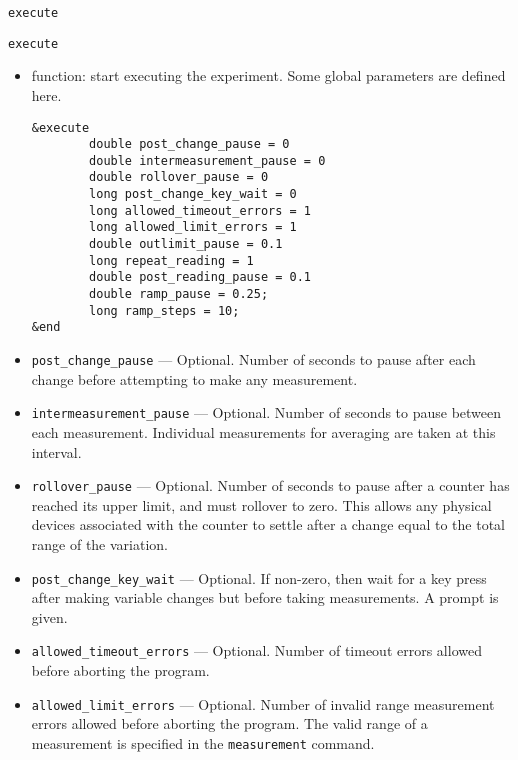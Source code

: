 \begin{itemize}
\begin{itemize}
\begin{latexonly}
\newpage\begin{center}{\Large \verb+execute+}\end{center}
\end{latexonly}
\begin{htmlonly}
\item {\Large \verb+execute+}
\end{htmlonly}
\begin{itemize}
   \item function: start executing the experiment. Some global parameters are defined here.
\begin{verbatim}
&execute
        double post_change_pause = 0
        double intermeasurement_pause = 0
        double rollover_pause = 0
        long post_change_key_wait = 0
        long allowed_timeout_errors = 1
        long allowed_limit_errors = 1
        double outlimit_pause = 0.1
        long repeat_reading = 1
        double post_reading_pause = 0.1
        double ramp_pause = 0.25;
        long ramp_steps = 10;
&end
\end{verbatim}
   \item {\verb+post_change_pause+} ---  Optional. Number of seconds to pause after each change before
      attempting to make any measurement.

   \item {\verb+intermeasurement_pause+} --- Optional. Number of
      seconds to pause between each measurement.  Individual
      measurements for averaging are taken at this interval.

   \item {\verb+rollover_pause+} --- Optional. Number of seconds to
      pause after a counter has reached its upper limit, and must
      rollover to zero. This allows any physical devices associated
      with the counter to settle after a change equal to the total
      range of the variation.

   \item {\verb+post_change_key_wait+} --- Optional. If non-zero, then
      wait for a key press after making variable changes but before
      taking measurements. A prompt is given.

   \item {\verb+allowed_timeout_errors+} --- Optional. Number of
      timeout errors allowed before aborting the program.

   \item {\verb+allowed_limit_errors+} --- Optional. Number of invalid
      range measurement errors allowed before aborting the
      program. The valid range of a measurement is specified in the
      {\verb+measurement+} command.


\end{itemize}
\end{itemize}
\end{itemize}

